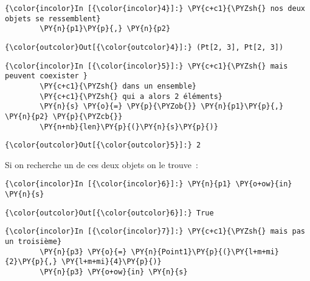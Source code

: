     \begin{Verbatim}[commandchars=\\\{\},frame=single,framerule=0.3mm,rulecolor=\color{cellframecolor}]
{\color{incolor}In [{\color{incolor}4}]:} \PY{c+c1}{\PYZsh{} nos deux objets se ressemblent}
        \PY{n}{p1}\PY{p}{,} \PY{n}{p2}
\end{Verbatim}


\begin{Verbatim}[commandchars=\\\{\},frame=single,framerule=0.3mm,rulecolor=\color{cellframecolor}]
{\color{outcolor}Out[{\color{outcolor}4}]:} (Pt[2, 3], Pt[2, 3])
\end{Verbatim}
            
    \begin{Verbatim}[commandchars=\\\{\},frame=single,framerule=0.3mm,rulecolor=\color{cellframecolor}]
{\color{incolor}In [{\color{incolor}5}]:} \PY{c+c1}{\PYZsh{} mais peuvent coexister }
        \PY{c+c1}{\PYZsh{} dans un ensemble}
        \PY{c+c1}{\PYZsh{} qui a alors 2 éléments}
        \PY{n}{s} \PY{o}{=} \PY{p}{\PYZob{}} \PY{n}{p1}\PY{p}{,} \PY{n}{p2} \PY{p}{\PYZcb{}}
        \PY{n+nb}{len}\PY{p}{(}\PY{n}{s}\PY{p}{)}
\end{Verbatim}


\begin{Verbatim}[commandchars=\\\{\},frame=single,framerule=0.3mm,rulecolor=\color{cellframecolor}]
{\color{outcolor}Out[{\color{outcolor}5}]:} 2
\end{Verbatim}
            
    Si on recherche un de ces deux objets on le trouve~:

    \begin{Verbatim}[commandchars=\\\{\},frame=single,framerule=0.3mm,rulecolor=\color{cellframecolor}]
{\color{incolor}In [{\color{incolor}6}]:} \PY{n}{p1} \PY{o+ow}{in} \PY{n}{s}
\end{Verbatim}


\begin{Verbatim}[commandchars=\\\{\},frame=single,framerule=0.3mm,rulecolor=\color{cellframecolor}]
{\color{outcolor}Out[{\color{outcolor}6}]:} True
\end{Verbatim}
            
    \begin{Verbatim}[commandchars=\\\{\},frame=single,framerule=0.3mm,rulecolor=\color{cellframecolor}]
{\color{incolor}In [{\color{incolor}7}]:} \PY{c+c1}{\PYZsh{} mais pas un troisième}
        \PY{n}{p3} \PY{o}{=} \PY{n}{Point1}\PY{p}{(}\PY{l+m+mi}{2}\PY{p}{,} \PY{l+m+mi}{4}\PY{p}{)}
        \PY{n}{p3} \PY{o+ow}{in} \PY{n}{s}
\end{Verbatim}


